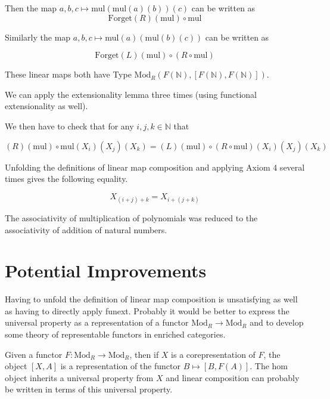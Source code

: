 \documentclass[12pt]{article} %
\theoremstyle{definition}
\theoremstyle{definition}
\theoremstyle{definition}
\theoremstyle{definition}
\begin{document}
Then the map $a, b, c \mapsto \text{mul} (\text{mul} (a)(b))(c)$ can be written as 
\begin{equation}
  \text{Forget}(R)(\text{mul}) \circ \text{mul}
\end{equation}

Similarly the map $a, b, c \mapsto \text{mul} (a)(\text{mul} (b)(c))$ can be written as

\begin{equation}
  \text{Forget}(L) (\text{mul}) \circ (R \circ \text{mul})
\end{equation}

These linear maps both have Type $\text{Mod}_R(F(\mathbb{N}), [F(\mathbb{N}), F(\mathbb{N})])$.

We can apply the extensionality lemma three times (using functional extensionality as well).

We then have to check that for any $i, j, k \in \mathbb{N}$ that

\begin{equation}
  (R)(\text{mul}) \circ \text{mul}(X_i)(X_j)(X_k) = (L) (\text{mul}) \circ (R \circ \text{mul})(X_i)(X_j)(X_k)
\end{equation}

Unfolding the definitions of linear map composition and applying Axiom 4 several times gives
the following equality.

\begin{equation}
  X_{(i + j) + k} = X_{i + (j + k)}
\end{equation}

The associativity of multiplication of polynomials was reduced to the associativity of addition
of natural numbers.

\section{Potential Improvements}

Having to unfold the definition of linear map composition is unsatisfying as well as having to 
directly apply funext. Probably it would be better to express the universal property as 
a representation of a functor $\text{Mod}_R \to \text{Mod}_R$ and to develop some
theory of representable functors in enriched categories.

Given a functor $F : \text{Mod}_R \to \text{Mod}_R$, then if $X$ is a corepresentation of $F$,
the object $[X, A]$ is a representation of the functor $B \mapsto [B, F(A)]$. The hom object 
inherits a universal property from $X$ and linear composition can probably be written in terms of this 
universal property.
\end{document}
